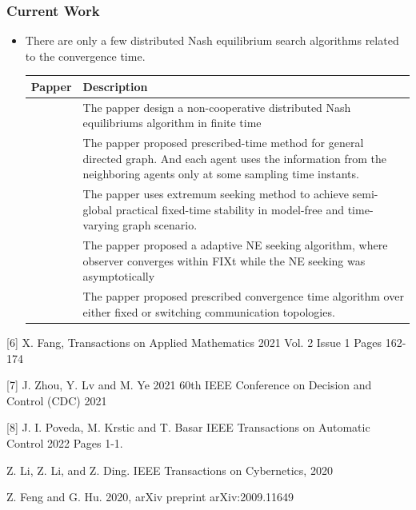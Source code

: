 \begin{frame}
\frametitle{\normalsize{Current Work}}\transwipe
  \begin{itemize} \footnotesize

  \item There are only a few distributed Nash equilibrium search algorithms related to the convergence time.

  \begin{tabular}{cp{9cm}}
    \hline
    Papper & Description  \\
    \hline
    [6] & The papper design a non-cooperative distributed Nash equilibriums algorithm  in finite time \\ 
    \hline
    [7] & The papper proposed prescribed-time method for general directed graph. And each
    agent uses the information from the neighboring agents only at some sampling time instants.  \\  
    \hline
    [8] & The papper uses extremum seeking method to achieve semi-global practical fixed-time stability in model-free and time-varying graph scenario.\\
    \hline
    [9] & The papper proposed a adaptive NE seeking algorithm, where observer converges within FIXt while the NE seeking was asymptotically\\ 
    \hline
    [10] & The papper proposed prescribed convergence time algorithm over either fixed or switching communication topologies. \\
    \bottomrule %
    
\end{tabular}
  \end{itemize}
  \breference
  \scriptsize
  [6] X. Fang, Transactions on Applied Mathematics 2021 Vol. 2 Issue 1 Pages 162-174 \par
  [7] J. Zhou, Y. Lv and M. Ye 2021 60th IEEE Conference on Decision and Control (CDC) 2021\par
  [8] J. I. Poveda, M. Krstic and T. Basar IEEE Transactions on Automatic Control 2022 Pages 1-1.\par
  [9] Z. Li, Z. Li, and Z. Ding.  IEEE Transactions on Cybernetics, 2020 \par 
  [10] Z. Feng and G. Hu. 2020, arXiv preprint arXiv:2009.11649
  \ereference
\end{frame}